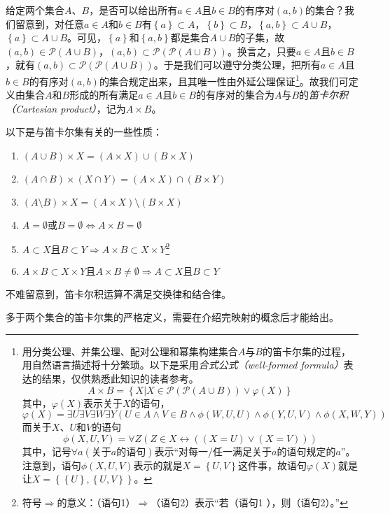 \documentclass[../main.tex]{subfiles}
\begin{document}
给定两个集合$A$、$B$，是否可以给出所有$a\in A$且$b\in B$的有序对$\left(a,b\right)$的集合？我们留意到，对任意$a\in A$和$b\in B$有$\left\{a\right\}\subset A$，$\left\{b\right\}\subset B$，$\left\{a,b\right\}\subset A\cup B$，$\left\{a\right\}\subset A\cup B$。可见，$\left\{a\right\}$和$\left\{a,b\right\}$都是集合$A\cup B$的子集，故$\left(a,b\right)\in\mathcal{P}\left(A\cup B\right)$，$\left(a,b\right)\subset\mathcal{P}\left(\mathcal{P}\left(A\cup B\right)\right)$。换言之，只要$a\in A$且$b\in B$，就有$\left(a,b\right)\subset\mathcal{P}\left(\mathcal{P}\left(A\cup B\right)\right)$。于是我们可以遵守分类公理，把所有$a\in A$且$b\in B$的有序对$\left(a,b\right)$的集合规定出来，且其唯一性由外延公理保证\footnote{
    用分类公理、并集公理、配对公理和幂集构建集合$A$与$B$的笛卡尔集的过程，用自然语言描述将十分繁琐。以下是采用\emph{合式公式（well-formed formula）}表达的结果，仅供熟悉此知识的读者参考。
    \[A\times B=\left\{X|X\in\mathcal{P}\left(\mathcal{P}\left(A\cup B\right)\right)\vee\varphi\left(X\right)\right\}
    \]
    其中，$\varphi\left(X\right)$表示关于$X$的语句，
    \[
        \varphi\left(X\right)=\exists U\exists V\exists W \exists Y\left(U\in A \wedge V\in B\wedge \phi\left(W,U,U\right)\wedge\phi\left(Y,U,V\right)\wedge\phi\left(X,W,Y\right)\right)
    \]
    而关于$X$、$U$和$V$的语句
    \[
        \phi\left(X,U,V\right)=\forall Z\left(Z\in X\leftrightarrow\left(\left(X=U\right)\vee\left(X=V\right)\right)\right)
    \]
    其中，记号$\forall a\left(\text{关于$a$的语句}\right)$表示“对每一/任一满足关于$a$的语句规定的$a$”。注意到，语句$\phi\left(X,U,V\right)$表示的就是$X=\left\{U,V\right\}$这件事，故语句$\varphi\left(X\right)$就是让$X=\left\{\left\{U\right\},\left\{U,V\right\}\right\}$。
}。故我们可定义由集合$A$和$B$形成的所有满足$a\in A$且$b\in B$的有序对的集合为$A$与$B$的\emph{笛卡尔积（Cartesian product）}，记为$A\times B$。

以下是与笛卡尔集有关的一些性质：
\begin{enumerate}
    \item $\left(A\cup B\right)\times X=\left(A\times X\right)\cup\left(B\times X\right)$
    \item $\left(A\cap B\right)\times \left(X\cap Y\right)=\left(A\times X\right)\cap\left(B\times Y\right)$
    \item $\left(A\setminus B\right)\times X=\left(A\times X\right)\setminus \left(B\times X\right)$
    \item $A=\emptyset\text{或}B=\emptyset\Leftrightarrow A\times B=\emptyset$
    \item $A\subset X\text{且}B\subset Y\Rightarrow A\times B\subset X\times Y$\footnote{符号$\Rightarrow$的意义：（语句1）$\Rightarrow$（语句2）表示“若（语句1 ），则（语句2）。”}
    \item $A\times B\subset X\times Y\text{且}A\times B\neq\emptyset\Rightarrow A\subset X\text{且}B\subset Y$
\end{enumerate}

不难留意到，笛卡尔积运算不满足交换律和结合律。

多于两个集合的笛卡尔集的严格定义，需要在介绍完映射的概念后才能给出。

\end{document}
